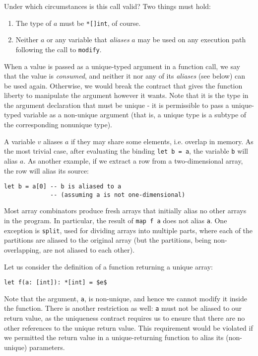 \documentclass[oneside,11pt]{book}
\begin{document}
Under which circumstances is this call valid?  Two things must hold:
\begin{enumerate}
\item The type of \texttt{$a$} must be \texttt{*[]int}, of course.

\item Neither \texttt{$a$} or any variable that \textit{aliases}
  \texttt{$a$} may be used on any execution path following the call to
  \texttt{modify}.
\end{enumerate}

When a value is passed as a unique-typed argument in a function call,
we say that the value is \textit{consumed}, and neither it nor any of
its \textit{aliases} (see below) can be used again.  Otherwise, we
would break the contract that gives the function liberty to manipulate
the argument however it wants.  Note that it is the type in the
argument declaration that must be unique - it is permissible to pass a
unique-typed variable as a non-unique argument (that is, a unique type
is a subtype of the corresponding nonunique type).

A variable $v$ aliases $a$ if they may share some elements,
i.e. overlap in memory.  As the most trivial case, after evaluating
the binding \texttt{let b = a}, the variable \texttt{b} will alias
\texttt{$a$}.  As another example, if we extract a row from a
two-dimensional array, the row will alias its source:

\begin{lstlisting}
let b = a[0] -- b is aliased to a
             -- (assuming a is not one-dimensional)
\end{lstlisting}

\noindent
Most array combinators produce fresh arrays that initially alias no
other arrays in the program.  In particular, the result of \texttt{map
  f a} does not alias \texttt{a}.  One exception is \texttt{split},
used for dividing arrays into multiple parts, where each of the
partitions are aliased to the original array (but the partitions,
being non-overlapping, are not aliased to each other).

Let us consider the definition of a function returning a unique array:

\begin{lstlisting}[mathescape=true]
let f(a: [int]): *[int] = $e$
\end{lstlisting}

Note that the argument, \texttt{a}, is non-unique, and hence we cannot
modify it inside the function.  There is another restriction as well:
\texttt{a} must not be aliased to our return value, as the uniqueness
contract requires us to ensure that there are no other references to
the unique return value.  This requirement would be violated if we
permitted the return value in a unique-returning function to alias its
(non-unique) parameters.
\end{document}
